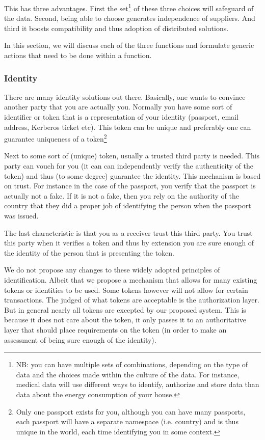 \documentclass{article}
\begin{document}
This has three advantages. First the set\footnote{NB: you can have multiple sets of combinations, depending on the type of data and the choices made within the culture of the data. For instance, medical data will use different ways to identify, authorize and store data than data about the energy consumption of your house.} of these three choices will safeguard of the data. Second, being able to choose generates independence of suppliers. And third it boosts compatibility and thus adoption of distributed solutions.


In this section, we will discuss each of the three functions and formulate generic actions that need to be done within a function.

\subsubsection{Identity}
There are many identity solutions out there. Basically, one wants to convince another party that you are actually you. Normally you have some sort of identifier or token that is a representation of your identity (passport, email address, Kerberos ticket etc). This token can be unique and preferably one can guarantee uniqueness of a token\footnote{Only one passport exists for you, although you can have many passports, each passport will have a separate namespace (i.e. country) and is thus unique in the world, each time identifying you in some context.}

Next to some sort of (unique) token, usually a trusted third party is needed. This party can vouch for you (it can can independently verify the authenticity of the token) and thus (to some degree) guarantee the identity. This mechanism is based on trust. For instance in the case of the passport, you verify that the passport is actually not a fake. If it is not a fake, then you rely on the authority of the country that they did a proper job of identifying the person when the passport was issued.

The last characteristic is that you as a receiver trust this third party. You trust this party when it verifies a token and thus by extension you are sure enough of the identity of the person that is presenting the token. 

We do not propose any changes to these widely adopted principles of identification. Albeit that we propose a mechanism that allows for many existing tokens or identities to be used. Some tokens however will not allow for certain transactions. The judged of what tokens are acceptable is the authorization layer. But in general nearly all tokens are excepted by our proposed system. This is because it does not care about the token, it only passes it to an authoritative layer that should place requirements on the token (in order to make an assessment of being sure enough of the identity).
\end{document}
